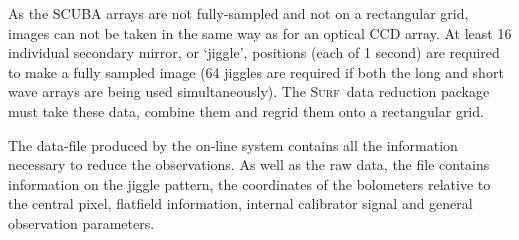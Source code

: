 \documentclass[twoside,11pt]{starlink}
\providecommand{\scusoft}          {\textsc{Surf}}
\begin{document}
As the SCUBA arrays are not fully-sampled and not on a rectangular grid, images
can not be taken in the same way as for an optical CCD array. At least 16
individual secondary mirror, or `jiggle', positions (each of 1 second) are
required to make a fully sampled image (64 jiggles are required if both the
long and short wave arrays are being used simultaneously). The \scusoft\ data
reduction package must take these data, combine them and regrid them onto a
rectangular grid.

The data-file produced by the on-line system contains all the information
necessary to reduce the observations. As well as the raw data, the file
contains information on the jiggle pattern, the coordinates of the
bolometers relative to the central pixel, flatfield information, internal
calibrator signal and general observation parameters.
\end{document}
